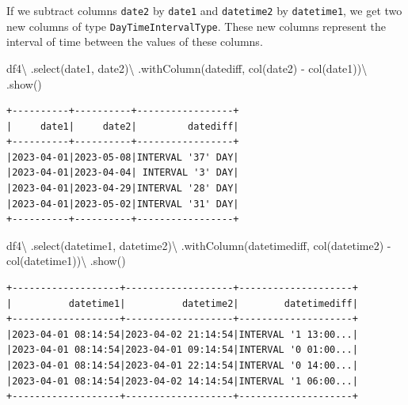 \documentclass[
  11pt,
  letterpaper,
  DIV=11,
  numbers=noendperiod]{scrreprt}
\newenvironment{Shaded}{\begin{snugshade}}{\end{snugshade}}
\newcommand{\NormalTok}[1]{\textcolor[rgb]{0.00,0.23,0.31}{#1}}
\newcommand{\OperatorTok}[1]{\textcolor[rgb]{0.37,0.37,0.37}{#1}}
\newcommand{\StringTok}[1]{\textcolor[rgb]{0.13,0.47,0.30}{#1}}
\begin{document}
If we subtract columns \texttt{date2} by \texttt{date1} and
\texttt{datetime2} by \texttt{datetime1}, we get two new columns of type
\texttt{DayTimeIntervalType}. These new columns represent the interval
of time between the values of these columns.

\begin{Shaded}
\begin{Highlighting}[]
\NormalTok{df4}\OperatorTok{\textbackslash{}}
\NormalTok{    .select(}\StringTok{\textquotesingle{}date1\textquotesingle{}}\NormalTok{, }\StringTok{\textquotesingle{}date2\textquotesingle{}}\NormalTok{)}\OperatorTok{\textbackslash{}}
\NormalTok{    .withColumn(}\StringTok{\textquotesingle{}datediff\textquotesingle{}}\NormalTok{, col(}\StringTok{\textquotesingle{}date2\textquotesingle{}}\NormalTok{) }\OperatorTok{{-}}\NormalTok{ col(}\StringTok{\textquotesingle{}date1\textquotesingle{}}\NormalTok{))}\OperatorTok{\textbackslash{}}
\NormalTok{    .show()}
\end{Highlighting}
\end{Shaded}

\begin{verbatim}
+----------+----------+-----------------+
|     date1|     date2|         datediff|
+----------+----------+-----------------+
|2023-04-01|2023-05-08|INTERVAL '37' DAY|
|2023-04-01|2023-04-04| INTERVAL '3' DAY|
|2023-04-01|2023-04-29|INTERVAL '28' DAY|
|2023-04-01|2023-05-02|INTERVAL '31' DAY|
+----------+----------+-----------------+
\end{verbatim}

\begin{Shaded}
\begin{Highlighting}[]
\NormalTok{df4}\OperatorTok{\textbackslash{}}
\NormalTok{    .select(}\StringTok{\textquotesingle{}datetime1\textquotesingle{}}\NormalTok{, }\StringTok{\textquotesingle{}datetime2\textquotesingle{}}\NormalTok{)}\OperatorTok{\textbackslash{}}
\NormalTok{    .withColumn(}\StringTok{\textquotesingle{}datetimediff\textquotesingle{}}\NormalTok{, col(}\StringTok{\textquotesingle{}datetime2\textquotesingle{}}\NormalTok{) }\OperatorTok{{-}}\NormalTok{ col(}\StringTok{\textquotesingle{}datetime1\textquotesingle{}}\NormalTok{))}\OperatorTok{\textbackslash{}}
\NormalTok{    .show()}
\end{Highlighting}
\end{Shaded}

\begin{verbatim}
+-------------------+-------------------+--------------------+
|          datetime1|          datetime2|        datetimediff|
+-------------------+-------------------+--------------------+
|2023-04-01 08:14:54|2023-04-02 21:14:54|INTERVAL '1 13:00...|
|2023-04-01 08:14:54|2023-04-01 09:14:54|INTERVAL '0 01:00...|
|2023-04-01 08:14:54|2023-04-01 22:14:54|INTERVAL '0 14:00...|
|2023-04-01 08:14:54|2023-04-02 14:14:54|INTERVAL '1 06:00...|
+-------------------+-------------------+--------------------+
\end{verbatim}
\end{document}

